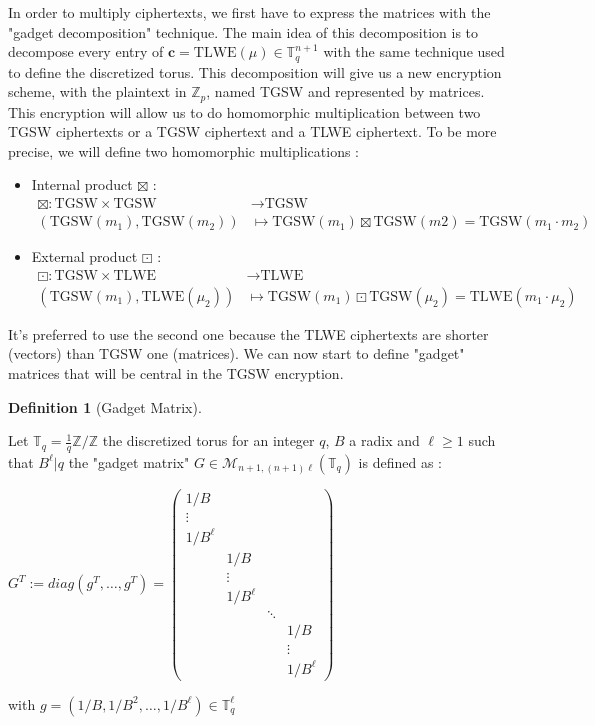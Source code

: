 \documentclass{article}
\newcommand{\Z}{\mathbb{Z}}
\newcommand{\T}{\mathbb{T}}
\theoremstyle{definition}
\newtheorem{definition}{Definition}[section]
\theoremstyle{Theorem}
\begin{document}
In order to multiply ciphertexts, we first have to express the matrices with the "gadget decomposition" technique. The main idea of this decomposition is to decompose every entry of $\mathbf{c} = \text{TLWE}(\mu)\in\T_q^{n+1}$ with the same technique used to define the discretized torus. This decomposition will give us a new encryption scheme, with the plaintext in $\Z_p$, named TGSW and represented by matrices. This encryption will allow us to do homomorphic multiplication between two TGSW ciphertexts or a TGSW ciphertext and a TLWE ciphertext. To be more precise, we will define two homomorphic multiplications :
\begin{itemize}
    \item Internal product $\boxtimes$ :
    \begin{align*}
      \boxtimes \colon \text{TGSW} \times \text{TGSW} &\to \text{TGSW}\\
      (\text{TGSW}(m_1),\text{TGSW}(m_2)) &\mapsto \text{TGSW}(m_1)\boxtimes \text{TGSW}(m2) = \text{TGSW}(m_1\cdot m_2)
    \end{align*}
    \item External product $\boxdot$ :
    \begin{align*}
      \boxdot \colon \text{TGSW} \times \text{TLWE} &\to \text{TLWE}\\
      (\text{TGSW}(m_1), \text{TLWE}(\mu_2)) &\mapsto \text{TGSW}(m_1)\boxdot \text{TGSW}(\mu_2) = \text{TLWE}(m_1\cdot \mu_2)
    \end{align*}
\end{itemize}

It's preferred to use the second one because the TLWE ciphertexts are shorter (vectors) than TGSW one (matrices). We can now start to define "gadget" matrices that will be central in the TGSW encryption. 

\begin{definition}[Gadget Matrix]\label{gadget-matrix}

Let $\T_q=\frac{1}{q}\Z/\Z$ the discretized torus for an integer $q$, $B$ a radix and $\ell\ge 1$ such that $B^\ell|q$ the "gadget matrix" $G\in\mathcal{M}_{n+1,(n+1)\ell}(\T_q)$ is defined as :

\begin{center}
    $
    G^T:= diag(g^T, \dots, g^T)=
    \begin{pmatrix}
    1/B & & & \\
    \vdots & & &\\
    1/B^\ell & & &\\
    & 1/B & & \\
    & \vdots & &\\
    & 1/B^\ell & & \\
    & & \ddots &\\
    & & & 1/B \\
    & & & \vdots \\
    & & & 1/B^\ell
    \end{pmatrix}
    $
\end{center}
with $g=(1/B, 1/B^2, \dots, 1/B^\ell) \in \T_q^\ell$
\end{definition}
\end{document}
